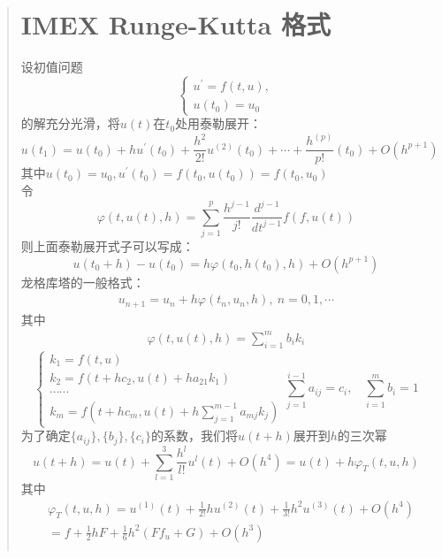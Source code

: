 \documentclass{article}
\begin{document}
\begin{CJK}{UTF8}{gkai}
\begin{quotation}
\section{IMEX Runge-Kutta 格式}
设初值问题
\begin{equation*}
\begin{cases}
u^{'}=f(t,u),\\
u(t_{0})=u_{0}
\end{cases}
\end{equation*}
的解充分光滑，将$u(t)$在$t_{0}$处用泰勒展开：
\begin{equation*}
u(t_{1})=u(t_{0})+hu^{'}(t_{0})+\frac{h^2}{2!}u^{(2)}(t_{0})+\cdots+\frac{h^{(p)}}{p!}(t_{0})+O(h^{p+1})
\end{equation*}
其中$u(t_{0})=u_{0},u^{'}(t_{0})=f(t_{0},u(t_{0}))=f(t_{0},u_{0})$\\
令
\begin{equation*}
\varphi(t,u(t),h)=\sum_{j=1}^{p}\frac{h^{j-1}}{j!}\frac{d^{j-1}}{dt^{j-1}}f(f,u(t))
\end{equation*}
则上面泰勒展开式子可以写成：
\begin{equation*}
u(t_{0}+h)-u(t_{0})=h\varphi(t_{0},h(t_{0}),h)+O(h^{p+1})
\end{equation*}
龙格库塔的一般格式：
\begin{gather*}
u_{n+1}=u_{n}+h\varphi(t_{n},u_{n},h),~n=0,1,\cdots
\end{gather*}
其中
\begin{gather}
\varphi(t,u(t),h)=\sum_{i=1}^{m}b_{i}k_{i}
\end{gather}
\begin{equation}
\begin{cases}
k_{1}=f(t,u)\\
k_{2}=f(t+hc_{2},u(t)+ha_{21}k_{1})\\
\cdots\cdots\\
k_{m}=f(t+hc_{m},u(t)+h\sum_{j=1}^{m-1}a_{mj}k_{j})
\end{cases}
\sum_{j=1}^{i-1}a_{ij}=c_{i},~~~~\sum_{i=1}^{m}b_{i}=1
\end{equation}
为了确定$\{a_{ij}\},\{b_{j}\},\{c_{i}\}$的系数，我们将$u(t+h)$展开到$h$的三次幂
\begin{equation*}
u(t+h)=u(t)+\sum_{l=1}^{3}\frac{h^l}{l!}u^{l}(t)+O(h^4)=u(t)+h\varphi_{T}(t,u,h)
\end{equation*}
其中
\begin{align*}
&\varphi_{T}(t,u,h)=u^{(1)}(t)+\frac{1}{2!}hu^{(2)}(t)+\frac{1}{3!}h^2u^{(3)}(t)+O(h^4)\\
&=f+\frac{1}{2}hF+\frac{1}{6}h^2(Ff_{u}+G)+O(h^3)\\

\end{align*}
\end{quotation}
\end{CJK}
\end{document}
